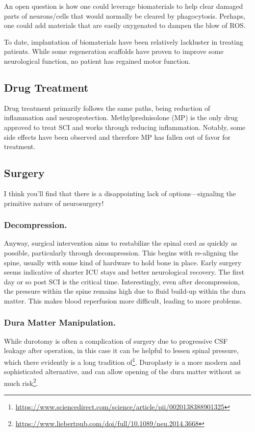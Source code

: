 \documentclass[12pt]{report}
\begin{document}
An open question is how one could leverage biomaterials to help clear damaged parts of neurons/cells that would normally be cleared by phagocytosis. Perhaps, one could add materials that are easily oxygenated to dampen the blow of ROS.\newline

To date, implantation of biomaterials have been relatively lackluster in treating patients. While some regeneration scaffolds have proven to improve some neurological function, no patient has regained motor function. 

\subsection{Drug Treatment}
Drug treatment primarily follows the same paths, being reduction of inflammation and neuroprotection. Methylprednisolone (MP) is the only drug approved to treat SCI and works through reducing inflammation. Notably, some side effects have been observed and therefore MP has fallen out of favor for treatment. 

\subsection{Surgery}
I think you'll find that there is a disappointing lack of options---signaling the primitive nature of neurosurgery!

\subsubsection{Decompression.}
 Anyway, surgical intervention aims to restabilize the spinal cord as quickly as possible, particularly through decompression. This begins with re-aligning the spine, usually with some kind of hardware to hold bone in place. Early surgery seems indicative of shorter ICU stays and better neurological recovery. The first day or so post SCI is the critical time. Interestingly, even after decompression, the pressure within the spine remains high due to fluid build-up within the dura matter. This makes blood reperfusion more difficult, leading to more problems. 
 
 \subsubsection{Dura Matter Manipulation.}
 While durotomy is often a complication of surgery due to progressive CSF leakage after operation, in this case it can be helpful to lessen spinal pressure, which there evidently is a long tradition of\footnote{\url{https://www.sciencedirect.com/science/article/pii/0020138388901325}}. Duroplasty is a more modern and sophisticated alternative, and can allow opening of the dura matter without as much risk\footnote{\url{https://www.liebertpub.com/doi/full/10.1089/neu.2014.3668}}.
\end{document}
